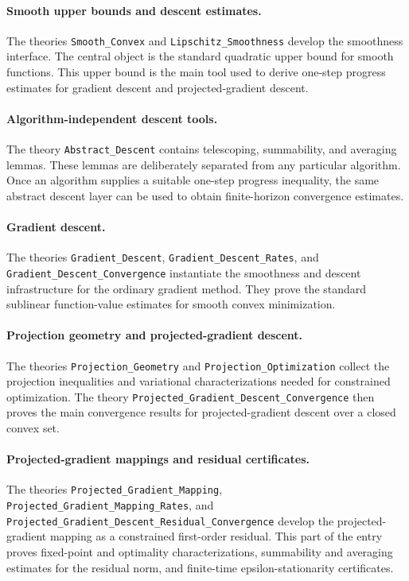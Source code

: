\documentclass[11pt,a4paper]{article}
\begin{document}
\paragraph{Smooth upper bounds and descent estimates.}
The theories \texttt{Smooth\_Convex} and \texttt{Lipschitz\_Smoothness} develop the smoothness interface.
The central object is the standard quadratic upper bound for smooth functions.
This upper bound is the main tool used to derive one-step progress estimates for gradient descent and projected-gradient descent.

\paragraph{Algorithm-independent descent tools.}
The theory \texttt{Abstract\_Descent} contains telescoping, summability, and averaging lemmas.
These lemmas are deliberately separated from any particular algorithm.
Once an algorithm supplies a suitable one-step progress inequality, the same abstract descent layer can be used to obtain finite-horizon convergence estimates.

\paragraph{Gradient descent.}
The theories \texttt{Gradient\_Descent}, \texttt{Gradient\_Descent\_Rates}, and \texttt{Gradient\_Descent\_Convergence} instantiate the smoothness and descent infrastructure for the ordinary gradient method.
They prove the standard sublinear function-value estimates for smooth convex minimization.

\paragraph{Projection geometry and projected-gradient descent.}
The theories \texttt{Projection\_Geometry} and \texttt{Projection\_Optimization} collect the projection inequalities and variational characterizations needed for constrained optimization.
The theory \texttt{Projected\_Gradient\_Descent\_Convergence} then proves the main convergence results for projected-gradient descent over a closed convex set.

\paragraph{Projected-gradient mappings and residual certificates.}
The theories \texttt{Projected\_Gradient\_Mapping}, \texttt{Projected\_Gradient\_Mapping\_Rates}, and \texttt{Projected\_Gradient\_Descent\_Residual\_Convergence} develop the projected-gradient mapping as a constrained first-order residual.
This part of the entry proves fixed-point and optimality characterizations, summability and averaging estimates for the residual norm, and finite-time epsilon-stationarity certificates.
\end{document}

